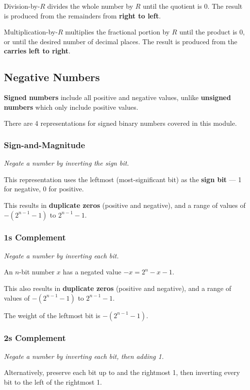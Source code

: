 Division-by-$R$ divides the whole number by $R$ until the quotient is 0.
The result is produced from the remainders from \textbf{right to left}.

Multiplication-by-$R$ multiplies the fractional portion by $R$ until the product is 0, or until the desired number of decimal places.
The result is produced from the \textbf{carries} \textbf{left to right}.

\subsection{Negative Numbers}
\textbf{Signed numbers} include all positive and negative values, unlike \textbf{unsigned numbers} which
only include positive values.

There are 4 representations for signed binary numbers covered in this module.

\subsubsection{Sign-and-Magnitude}
\emph{Negate a number by inverting the sign bit.}

This representation uses the leftmost (most-significant bit) as the \textbf{sign bit} --- 1 for negative, 0 for positive.

This results in \textbf{duplicate zeros} (positive and negative), and a range of values of $-\left(2^{n-1} - 1\right)$ to $2^{n-1}-1$.

\subsubsection{1s Complement}
\emph{Negate a number by inverting each bit.}

An $n$-bit number $x$ has a negated value $-x = 2^n - x - 1$.

This also results in \textbf{duplicate zeros} (positive and negative), and a range of values of $-\left(2^{n-1} - 1\right)$ to $2^{n-1}-1$.


The weight of the leftmost bit is $-\left(2^{n-1} - 1\right)$.

\subsubsection{2s Complement}
\emph{Negate a number by inverting each bit, then adding 1.}

Alternatively, preserve each bit up to and the rightmost 1,
then inverting every bit to the left of the rightmost 1.

